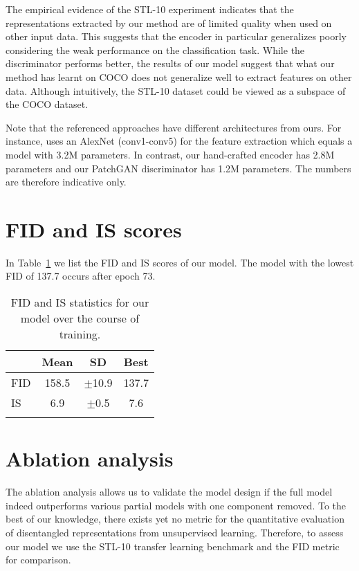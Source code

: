 \documentclass[a4paper,12pt]{report}
\begin{document}
The empirical evidence of the STL-10 experiment indicates that the representations extracted by our method are of limited quality when used on other input data. This suggests that the encoder in particular generalizes poorly considering the weak performance on the classification task. While the discriminator performs better, the results of our model suggest that what our method has learnt on COCO does not generalize well to extract features on other data. Although intuitively, the STL-10 dataset could be viewed as a subspace of the COCO dataset.

Note that the referenced approaches have different architectures from ours. For instance, \cite{SpotArtifacts} uses an AlexNet (conv1-conv5) for the feature extraction which equals a model with 3.2M parameters. In contrast, our hand-crafted encoder has 2.8M parameters and our PatchGAN discriminator has 1.2M parameters. The numbers are therefore indicative only.


\section{FID and IS scores}
In Table~\ref{tab:fid_is_stats} we list the FID and IS scores of our model. The model with the lowest FID of 137.7 occurs after epoch 73.
\begin{table}[ht!]
\centering
\begin{tabular}{l|c|c|c}
\Xhline{0.8pt}
 & \textbf{Mean} & \textbf{SD} & \textbf{Best} \\
\hline
FID & 158.5 & $\pm$10.9 & 137.7\\
\hline
IS & 6.9 & $\pm$0.5 & 7.6\\
\Xhline{0.8pt}
\end{tabular}
\caption{FID and IS statistics for our model over the course of training.} 
\label{tab:fid_is_stats}
\end{table}


\section{Ablation analysis}
The ablation analysis allows us to validate the model design if the full model indeed outperforms various partial models with one component removed. To the best of our knowledge, there exists yet no metric for the quantitative evaluation of disentangled representations from unsupervised learning. Therefore, to assess our model we use the STL-10 transfer learning benchmark and the FID metric for comparison.
\end{document}
